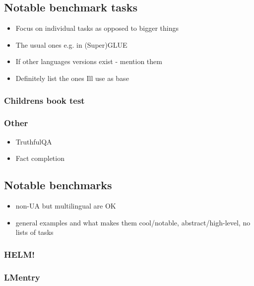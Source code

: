 \subsection{Notable benchmark tasks}\label{notable-benchmark-tasks}

\begin{itemize}
\tightlist
\item
  Focus on individual tasks as opposed to bigger things
\item
  The usual ones e.g. in (Super)GLUE
\item
  If other languages\textquotesingle{} versions exist - mention them
\item
  Definitely list the ones I\textquotesingle ll use as base
\end{itemize}

\subsubsection{Children\textquotesingle s book
test}\label{childrens-book-test}

\subsubsection{Other}\label{other}

\begin{itemize}
\tightlist
\item
  TruthfulQA
\item
  Fact completion
\end{itemize}

\subsection{Notable benchmarks}\label{notable-benchmarks}

\begin{itemize}
\tightlist
\item
  non-UA but multilingual are OK
\item
  general examples and what makes them cool/notable,
  abstract/high-level, no lists of tasks
\end{itemize}

\subsubsection{HELM!}\label{helm}

\subsubsection{LMentry}\label{lmentry}


